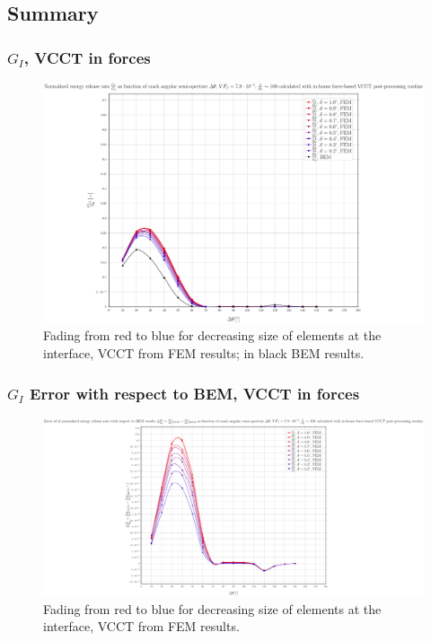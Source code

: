 \documentclass[first,firstsupp,lastsupp,handout,last,hyperref,table]{ETHclass}
\begin{document}

\subsection{Summary}

\begin{frame}
\frametitle{\small $G_{I}$, VCCT in forces}
\vspace{-0.5cm}
\centering
\captionsetup[figure]{font=scriptsize,labelfont=scriptsize}
\begin{figure}[!h]
\centering
\includegraphics[height=0.7\textheight]{2017-07-10_AbqRunSummary_SmallStrain_M-F-VCCT_GI.pdf}
  \caption{\scriptsize Fading from red to blue for decreasing size of elements at the interface, VCCT from FEM results; in black BEM results.}
  \label{fig:res1}
\end{figure}
\end{frame}

\begin{frame}
\frametitle{\small $G_{I}$ Error with respect to BEM, VCCT in forces}
\vspace{-0.5cm}
\centering
\captionsetup[figure]{font=scriptsize,labelfont=scriptsize}
\begin{figure}[!h]
\centering
\includegraphics[height=0.7\textheight]{2017-07-10_AbqRunSummary_SmallStrain_M-F-VCCT_GI_ERR.pdf}
  \caption{\scriptsize Fading from red to blue for decreasing size of elements at the interface, VCCT from FEM results.}
  \label{fig:res1}
\end{figure}
\end{frame}
\end{document}
